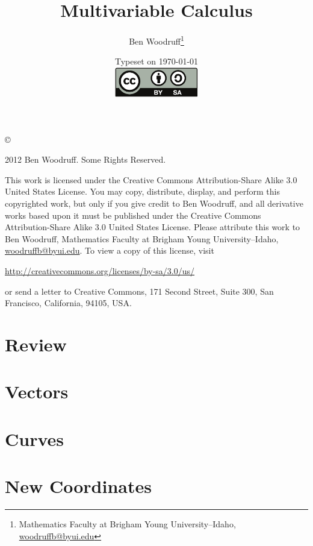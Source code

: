 \documentclass[letterpaper,oneside]{book}%
\newcommand{\wrapup}{
\bmw{\section{Wrap Up}
Once you have finished the problems in the section and feel comfortable with the ideas, create a short one page lesson plan that contains examples of the key ideas.  You will get a chance to teach from this lesson plan prior to taking the exam. Then log on to Brainhoney and download the quiz. Once you have taken the quiz, you can upload your work back to brainhoney and then download the key to see how you did. If you still need to work on mastering some of the ideas, please do so and then demonstrate your mastery though the quiz corrections.}
}
\newcommand{\bmw}[1]{}
\theoremstyle{plain}
\theoremstyle{box}
\begin{document}
\frontmatter
\title{Multivariable Calculus}
\author{Ben Woodruff\thanks{Mathematics Faculty at Brigham Young
    University--Idaho, \url{woodruffb@byui.edu}}}
\date{Typeset on \today\\
\vfill
\includegraphics[height=1.3cm]{by-sa}
\vfill}
\maketitle
\thispagestyle{empty}
\noindent\copyright{ 2012 Ben Woodruff.  Some Rights Reserved.\\

\bigskip

\noindent This work is licensed under the Creative Commons Attribution-Share Alike 3.0 United States License.  You may copy, distribute, display, and perform this copyrighted work, but only if you give credit to Ben Woodruff, and all derivative works based upon it must be published under the Creative Commons Attribution-Share Alike 3.0 United States License. Please attribute this work to Ben Woodruff, Mathematics Faculty at Brigham Young University--Idaho, \url{woodruffb@byui.edu}. To view a copy of this license, visit
\begin{center}
  \url{http://creativecommons.org/licenses/by-sa/3.0/us/}
\end{center}
or send a letter to Creative Commons, 171 Second Street, Suite 300, San Francisco, California, 94105, USA.}
\tableofcontents

\mainmatter

\chapter{Review}

\wrapup

\chapter{Vectors}

\wrapup


\chapter{Curves}

\wrapup

\chapter{New Coordinates}

\wrapup
\end{document}
